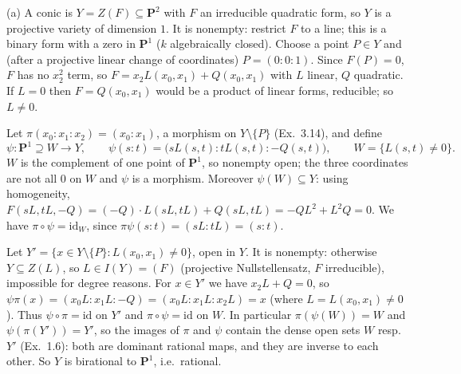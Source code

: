 \documentclass[11pt]{article}
\begin{document}
\pf
(a) A conic is $Y=Z(F)\subseteq\mathbf P^2$ with $F$ an irreducible quadratic form, so $Y$ is a projective variety of dimension $1$. It is nonempty: restrict $F$ to a line; this is a binary form with a zero in $\mathbf P^1$ ($k$ algebraically closed). Choose a point $P\in Y$ and (after a projective linear change of coordinates) $P=(0:0:1)$. Since $F(P)=0$, $F$ has no $x_2^2$ term, so $F=x_2L(x_0,x_1)+Q(x_0,x_1)$ with $L$ linear, $Q$ quadratic. If $L=0$ then $F=Q(x_0,x_1)$ would be a product of linear forms, reducible; so $L\ne0$.

Let $\pi(x_0:x_1:x_2)=(x_0:x_1)$, a morphism on $Y\setminus\{P\}$ (Ex.~3.14), and define
\[
\psi:\mathbf P^1\supseteq W\to Y,\qquad \psi(s:t)=\bigl(sL(s,t):tL(s,t):-Q(s,t)\bigr),\qquad W=\{L(s,t)\ne0\}.
\]
$W$ is the complement of one point of $\mathbf P^1$, so nonempty open; the three coordinates are not all $0$ on $W$ and $\psi$ is a morphism. Moreover $\psi(W)\subseteq Y$: using homogeneity, $F(sL,tL,-Q)=(-Q)\cdot L(sL,tL)+Q(sL,tL)=-QL^2+L^2Q=0$. We have $\pi\circ\psi=\mathrm{id}_W$, since $\pi\psi(s:t)=(sL:tL)=(s:t)$.

Let $Y'=\{x\in Y\setminus\{P\}: L(x_0,x_1)\neq0\}$, open in $Y$. It is nonempty: otherwise $Y\subseteq Z(L)$, so $L\in I(Y)=(F)$ (projective Nullstellensatz, $F$ irreducible), impossible for degree reasons. For $x\in Y'$ we have $x_2L+Q=0$, so $\psi\pi(x)=(x_0L:x_1L:-Q)=(x_0L:x_1L:x_2L)=x$ (where $L=L(x_0,x_1)\ne0$). Thus $\psi\circ\pi=\mathrm{id}$ on $Y'$ and $\pi\circ\psi=\mathrm{id}$ on $W$. In particular $\pi(\psi(W))=W$ and $\psi(\pi(Y'))=Y'$, so the images of $\pi$ and $\psi$ contain the dense open sets $W$ resp.\ $Y'$ (Ex.~1.6): both are dominant rational maps, and they are inverse to each other. So $Y$ is birational to $\mathbf P^1$, i.e.\ rational.
\end{document}
